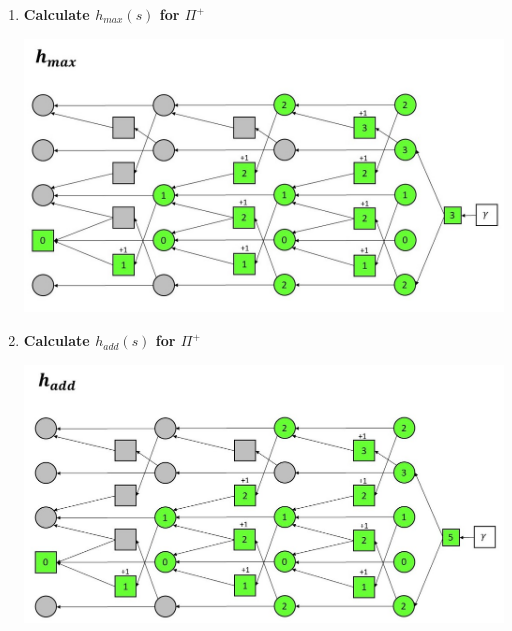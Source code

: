 \documentclass[12pt,a4paper]{article}
\begin{document}
\begin{enumerate}[label=(\alph*), listparindent=1.5em]
	\item \textbf{Calculate $h_{max}(s)$ for $\Pi^+ $}\\
	\begin{center}
		\includegraphics[scale=0.5]{hmax.jpg}\\
	\end{center}
	\newpage
	\item \textbf{Calculate $h_{add}(s)$ for $\Pi^+ $}\\
	\begin{center}
		\includegraphics[scale=0.5]{hadd.jpg}\\
	\end{center}

\end{enumerate}
\end{document}
